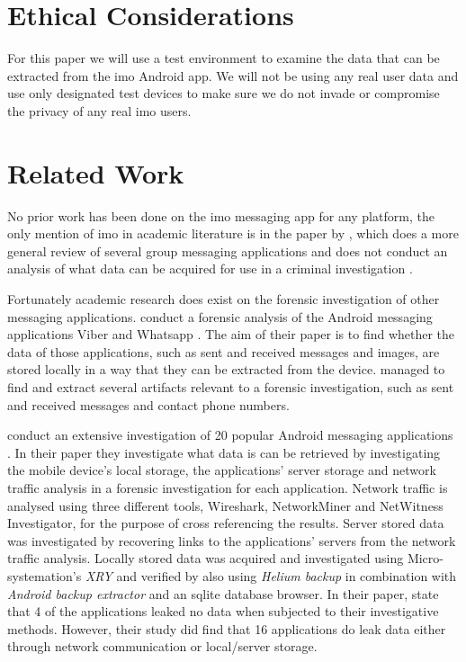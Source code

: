 \documentclass[conference]{IEEEtran}
\begin{document}
\section{Ethical Considerations}\label{sec:ethics}

For this paper we will use a test environment to examine the data that can be
extracted from the imo Android app. We will not be using any real user data and
use only designated test devices to make sure we do not invade or compromise the
privacy of any real imo users.


\section{Related Work}\label{sec:relwork}

No prior work has been done on the imo messaging app for any platform, the only
mention of imo in academic literature is in the paper by \citeauthor{zhu}, which
does a more general review of several group messaging applications and does not
conduct an analysis of what data can be acquired for use in a criminal
investigation \cite{zhu}.

Fortunately academic research does exist on the forensic investigation of other
messaging applications. \citeauthor{mahajan2013forensic} conduct a forensic
analysis of the Android messaging applications Viber and Whatsapp
\cite{mahajan2013forensic}. The aim of their paper is to find whether the data
of those applications, such as sent and received messages and images, are stored
locally in a way that they can be extracted from the device.
\citeauthor{mahajan2013forensic} managed to find and extract several artifacts
relevant to a forensic investigation, such as sent and received messages and
contact phone numbers.

\citeauthor{walnycky2015network} conduct an extensive investigation of 20
popular Android messaging applications \cite{walnycky2015network}. In their
paper they investigate what data is can be retrieved by investigating the mobile
device's local storage, the applications' server storage and network traffic
analysis in a forensic investigation for each application. Network traffic is
analysed using three different tools, Wireshark, NetworkMiner and NetWitness
Investigator, for the purpose of cross referencing the results. Server stored
data was investigated by recovering links to the applications' servers from the
network traffic analysis. Locally stored data was acquired and investigated
using Micro-systemation's {\it XRY} and verified by also using {\it Helium
backup} in combination with {\it Android backup extractor} and an sqlite
database browser.  In their paper, \citeauthor{walnycky2015network} state that 4
of the applications leaked no data when subjected to their investigative
methods.  However, their study did find that 16 applications do leak data either
through network communication or local/server storage.
\end{document}
